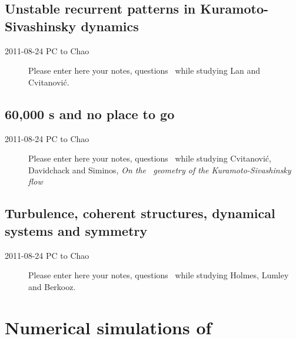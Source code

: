 \subsection{Unstable recurrent patterns in {Kuramoto-Sivashinsky} dynamics}
\label{s:lanCvit07}

\begin{description}

\item[2011-08-24 PC to Chao]
Please enter here your notes, questions \etc\ while studying
Lan and Cvitanovi{\'c}.

\end{description}



\subsection{60,000 \rpo s and no place to go}
\label{s:SCD07}

\begin{description}

\item[2011-08-24 PC to Chao]
Please enter here your notes, questions \etc\ while studying
Cvitanovi{\'c}, Davidchack and Siminos,
\emph{On the \statesp\ geometry of the {Kuramoto-Sivashinsky} flow}

\end{description}

\subsection{Turbulence, coherent structures, dynamical systems and
symmetry}
\label{s:Holmes96}

\begin{description}

\item[2011-08-24 PC to Chao]
Please enter here your notes, questions \etc\ while studying
Holmes, Lumley and Berkooz.

\end{description}

\section{Numerical simulations of \KSe}
\label{s:KSnumerical}

